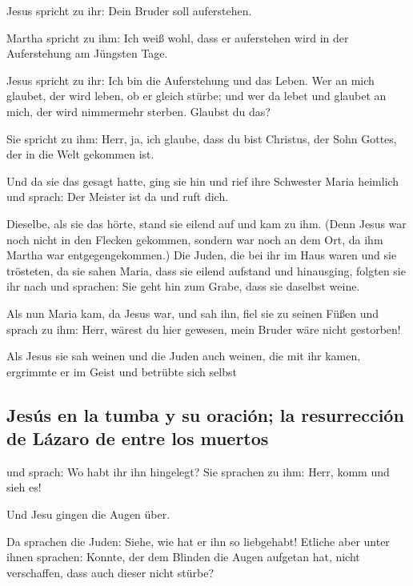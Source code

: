 Jesus spricht zu ihr: Dein Bruder soll auferstehen.

 Martha spricht zu ihm: Ich weiß wohl, dass er
auferstehen wird in der Auferstehung am Jüngsten Tage.

 Jesus spricht zu ihr: Ich bin die Auferstehung und das
Leben. Wer an mich glaubet, der wird leben, ob er gleich stürbe;
 und wer da lebet und glaubet an mich, der wird
nimmermehr sterben. Glaubst du das?

 Sie spricht zu ihm: Herr, ja, ich glaube, dass du bist
Christus, der Sohn Gottes, der in die Welt gekommen ist.

 Und da sie das gesagt hatte, ging sie hin und rief ihre
Schwester Maria heimlich und sprach: Der Meister ist da und ruft dich.

 Dieselbe, als sie das hörte, stand sie eilend auf und
kam zu ihm.  (Denn Jesus war noch nicht in den Flecken
gekommen, sondern war noch an dem Ort, da ihm Martha war
entgegengekommen.)  Die Juden, die bei ihr im Haus waren
und sie trösteten, da sie sahen Maria, dass sie eilend aufstand und
hinausging, folgten sie ihr nach und sprachen: Sie geht hin zum Grabe,
dass sie daselbst weine.

 Als nun Maria kam, da Jesus war, und sah ihn, fiel sie
zu seinen Füßen und sprach zu ihm: Herr, wärest du hier gewesen, mein
Bruder wäre nicht gestorben!

 Als Jesus sie sah weinen und die Juden auch weinen, die
mit ihr kamen, ergrimmte er im Geist und betrübte sich selbst

\hypertarget{jesuxfas-en-la-tumba-y-su-oraciuxf3n-la-resurrecciuxf3n-de-luxe1zaro-de-entre-los-muertos}{%
\subsection{Jesús en la tumba y su oración; la resurrección de Lázaro de
entre los
muertos}\label{jesuxfas-en-la-tumba-y-su-oraciuxf3n-la-resurrecciuxf3n-de-luxe1zaro-de-entre-los-muertos}}

 und sprach: Wo habt ihr ihn hingelegt? Sie sprachen zu
ihm: Herr, komm und sieh es!

 Und Jesu gingen die Augen über.

 Da sprachen die Juden: Siehe, wie hat er ihn so
liebgehabt!  Etliche aber unter ihnen sprachen: Konnte,
der dem Blinden die Augen aufgetan hat, nicht verschaffen, dass auch
dieser nicht stürbe?

